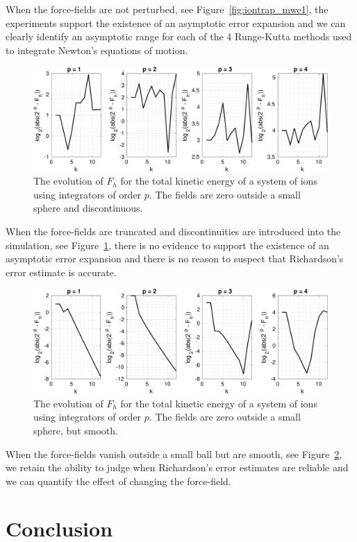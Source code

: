 \documentclass[runningheads]{llncs}
\begin{document}
When the force-fields are not perturbed, see Figure~\ref{fig:iontrap_mwe1}, the experiments support the existence of an asymptotic error expansion and we can clearly identify an asymptotic range for each of the 4 Runge-Kutta methods used to integrate Newton's equations of motion.
\begin{figure}[h!]
  \centering
  \includegraphics[width=\linewidth]{iontrap_mwe2.pdf}
  \caption{The evolution of $F_h$ for the total kinetic energy of a system of ions using integrators of order $p$. The fields are zero outside a small sphere and discontinuous.}
  \label{fig:iontrap_mwe2}
\end{figure}
When the force-fields are truncated and discontinuities are introduced into the simulation, see Figure~\ref{fig:iontrap_mwe2}, there is no evidence to support the existence of an asymptotic error expansion and there is no reason to suspect that Richardson's error estimate is accurate.
\begin{figure}
  \centering
  \includegraphics[width=\linewidth]{iontrap_mwe4.pdf}
  \caption{The evolution of $F_h$ for the total kinetic energy of a system of ions using integrators of order $p$. The fields are zero outside a small sphere, but smooth.}
  \label{fig:iontrap_mwe4}
\end{figure}
When the force-fields vanish outside a small ball but are smooth, see Figure~\ref{fig:iontrap_mwe4}, we retain the ability to judge when Richardson's error estimates are reliable and we can quantify the effect of changing the force-field.

\section{Conclusion}
\end{document}
